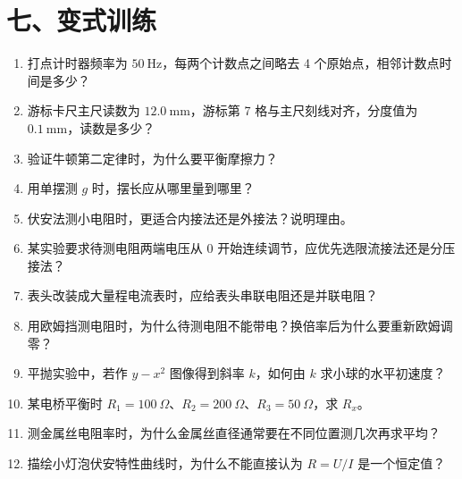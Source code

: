 \section*{七、变式训练}

\begin{enumerate}
  \item 打点计时器频率为 $50\ \mathrm{Hz}$，每两个计数点之间略去 4 个原始点，相邻计数点时间是多少？
  \item 游标卡尺主尺读数为 $12.0\ \mathrm{mm}$，游标第 7 格与主尺刻线对齐，分度值为 $0.1\ \mathrm{mm}$，读数是多少？
  \item 验证牛顿第二定律时，为什么要平衡摩擦力？
  \item 用单摆测 $g$ 时，摆长应从哪里量到哪里？
  \begin{center}
  
  \end{center}
  \item 伏安法测小电阻时，更适合内接法还是外接法？说明理由。
  \begin{center}
  
  \end{center}
  \item 某实验要求待测电阻两端电压从 $0$ 开始连续调节，应优先选限流接法还是分压接法？
  \item 表头改装成大量程电流表时，应给表头串联电阻还是并联电阻？
  \item 用欧姆挡测电阻时，为什么待测电阻不能带电？换倍率后为什么要重新欧姆调零？
  \item 平抛实验中，若作 $y-x^2$ 图像得到斜率 $k$，如何由 $k$ 求小球的水平初速度？
  \item 某电桥平衡时 $R_1=100\ \Omega$、$R_2=200\ \Omega$、$R_3=50\ \Omega$，求 $R_x$。
  \item 测金属丝电阻率时，为什么金属丝直径通常要在不同位置测几次再求平均？
  \item 描绘小灯泡伏安特性曲线时，为什么不能直接认为 $R=U/I$ 是一个恒定值？
\end{enumerate}

